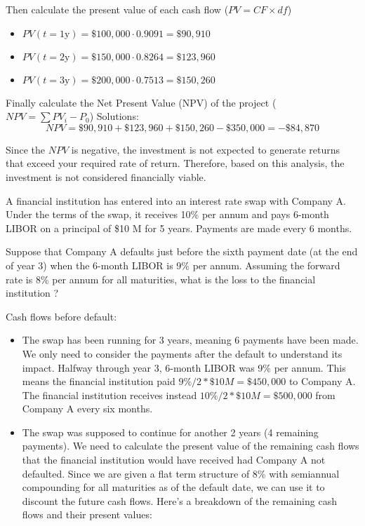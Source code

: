 \documentclass[12pt,a4paper]{exam}
\begin{document}
\begin{questions}
\begin{solution}
Then calculate the present value of each cash flow ($PV=CF\times df$)
\begin{itemize}
\item $PV(t=\text{1y})=\$100,000\cdot 0.9091 = \$90,910$
\item $PV(t=\text{2y})=\$150,000\cdot 0.8264 = \$123,960$
\item $PV(t=\text{3y})=\$200,000\cdot 0.7513 = \$150,260$
\end{itemize}

Finally calculate the Net Present Value (NPV) of the project ($NPV = \sum PV_i  - P_0$)
Solutions:
\begin{equation*}
NPV = \$90,910 + \$123,960 + \$150,260 - \$350,000 = -\$84,870
\end{equation*}

Since the $NPV$ is negative, the investment is not expected to generate returns that exceed your required rate of return. Therefore, based on this analysis, the investment is not considered financially viable.
\end{solution}

\question 
A financial institution has entered into an interest rate swap with Company A. Under the terms of the swap, it receives 10\% per annum and pays 6-month LIBOR on a principal of \$10 M for 5 years. Payments are made every 6 months. 

Suppose that Company A defaults just before the sixth payment date (at the end of year 3) when the 6-month LIBOR is 9\% per annum.
Assuming the forward rate is 8\% per annum for all maturities, what is the loss to the financial institution ? 
\makeemptybox{3cm}

\begin{solution}
Cash flows before default:
\begin{itemize}
\item The swap has been running for 3 years, meaning 6 payments have been made. We only need to consider the payments after the default to understand its impact.
Halfway through year 3, 6-month LIBOR was 9\% per annum. This means the financial institution paid $9\%/2 * \$10 M = \$450,000$ to Company A. The financial institution receives instead $10\%/2 * \$10 M = \$500,000$ from Company A every six months.
\item The swap was supposed to continue for another 2 years (4 remaining payments). We need to calculate the present value of the remaining cash flows that the financial institution would have received had Company A not defaulted.
Since we are given a flat term structure of 8\% with semiannual compounding for all maturities as of the default date, we can use it to discount the future cash flows. Here's a breakdown of the remaining cash flows and their present values:


\end{itemize}
\end{solution}
\end{questions}
\end{document}
